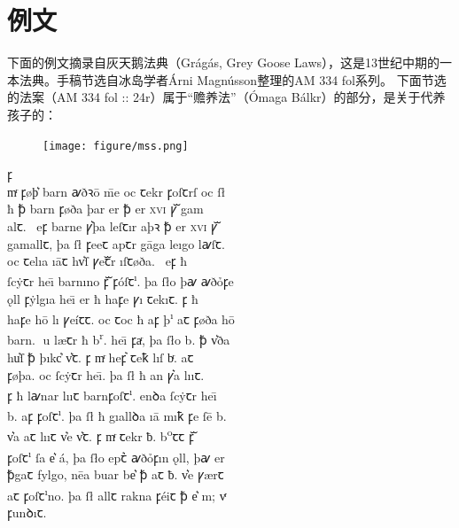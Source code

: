 \section{例文}
下面的例文摘录自灰天鹅法典（Grágás, Grey Goose Laws），这是13世纪中期的一本法典。手稿节选自冰岛学者Árni Magnússon整理的AM 334 fol系列\footnotemark。
下面节选的法案（AM 334 fol :: 24r）属于“赡养法”（Ómaga Bálkr\footnotemark）的部分，是关于代养孩子的：
\begin{multicols}{2}
    \begin{figure}[H]
        \texttt{[image: figure/mss.png]}
    \end{figure}
    \newcolumn
    \quad
    \fontsize{14pt}{14pt}\selectfont
    {\medieval
    \hfill \Eclosedunical ꝼ \\
    \noindent mͬ ꝼøþ͛ barn {\andron ꜹ}ð{\andron ꝛ}\=o \=me oc ꞇekr {\vbart} ꝼoſꞇrſ oc ſ\l\\
    ħ ꝥ barn ꝼøða þar {\vbart} er ꝥ er \textsc{xvi} ꝩᷓ gam\\
    alꞇ. \Eunical \nwithdescender \ eꝼ barne ꝩ͛þa leſꞇır aþ{\andron ꝛ} ꝥ er \textsc{xvi} ꝩᷓ\\
    gamallꞇ, þa ſ{\l} ꝼeeꞇ apꞇr g\=aga leıgo l{\andron ꜹ}ſꞇ.\\
    oc ꞇelıa ı\=aꞇ {\vbart} hv͛ſ ꝩeꞇᷓr ı\nwithdescender ſꞇøða\nwithdescender . \Eclosedunical \nwithdescender \ eꝼ ħ\\
    ſc\.yꞇr he\=ı barnıno ꝼᷓ ꝼóſꞇ\textsuperscript{ı}. þa {ſ\l}o þ{\andron ꜹ} {\andron ꜹ}ðỏꝼe\\
    \k{o}ll ꝼ\.ylgıa he\=ı er ħ haꝼ\dh e ꝩı ꞇekıꞇ. \Eunical ꝼ ħ \\
    haꝼ\dh e h\=o lı{\dh} ꝩe\'{i}ꞇꞇ. oc ꞇoc ħ aꝼ þ\textsuperscript{ı} aꞇ ꝼøða h\=o \\
    barn. {\LARGE }u l\ae ꞇr ħ b\textsuperscript{r}. he\=ı ꝼaͬ, þa {ſ\l}o b. ꝥ v͛ða\\
    hu͛ſ ꝥ
    þıkc͛ v͛ꞇ. \Eclosedunical ꝼ mͬ heꝼ͛ ꞇeꝁ {\vbart} lı\dh ſ bͬ. aꞇ \\
    ꝼøþa. oc ſc\.yꞇr he\=ı. þa {ſ\l} ħ an ꝩ͛a lı\dh ıꞇ.\\
    \Eclosedunical ꝼ ħ l{\andron ꜹ}nar lı\dh ıꞇ barnꝼoſꞇ\textsuperscript{ı}. enꝺa ſc\.yꞇr he\=ı \\
    b. aꝼ ꝼoſꞇ\textsuperscript{ı}. þa {ſ\l} ħ gıallꝺa ı\=a mıꝁ ꝼe ſ\=e b.\\
    v͛\dh a aꞇ lı\dh ıꞇ v͛e v͛ꞇ. \Eclosedunical ꝼ mͬ ꞇekr ƀ. b\textsuperscript{o}ꞇꞇ ꝼᷓ \\
    ꝼoſꞇ\textsuperscript{ı} ſa e͛ \'{a}, þa {ſ\l}o epꞇ͛ {\andron ꜹ}ðỏꝼın \k{o}ll, þ{\andron ꜹ} er \\
    ꝥgaꞇ fylg\dh o, n\=ea buar be͛ ꝥ aꞇ ƀ. v͛e  ꝩ\ae rꞇ\\
    aꞇ ꝼoſꞇ\textsuperscript{ı}no. þa {ſ\l} allꞇ rakna ꝼ\'{e}iꞇ ꝥ e͛ m; vͬ\\
    ꝼunꝺıꞇ.
    }
\end{multicols}
